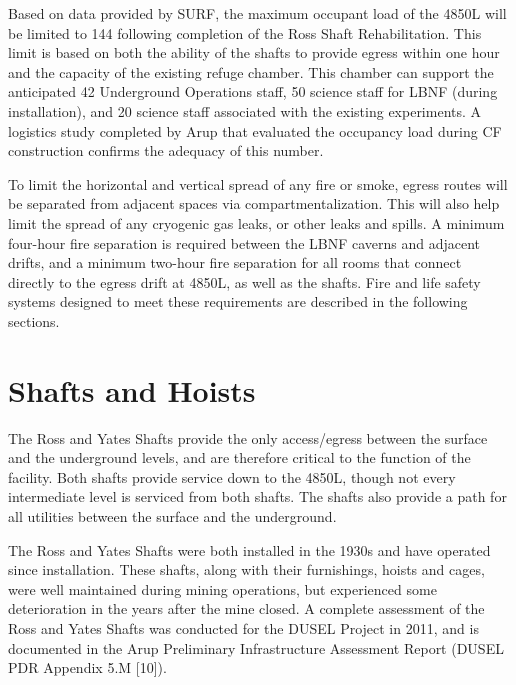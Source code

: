 Based on data provided by SURF, the maximum occupant load of the 4850L will be limited to %
144 following completion of the Ross Shaft Rehabilitation. This limit is based on both the ability of the shafts to provide egress within one hour and the capacity of the existing refuge chamber.  This chamber can support the anticipated 42 Underground Operations staff, 50 science staff for LBNF (during installation), and 20 science staff associated with the existing experiments. A logistics study\cite{lbnf-logistics} completed by Arup that evaluated the occupancy load during CF construction %
confirms the adequacy of this number.

To limit the horizontal and vertical spread of any fire or smoke, egress routes will be separated from adjacent spaces via  compartmentalization. This will also help limit the spread of %
any cryogenic gas leaks, or other leaks and spills. %
A minimum four-hour fire separation is required between the LBNF caverns and adjacent drifts, and a minimum two-hour fire separation for all rooms that connect directly to the egress drift at 4850L, as well as the shafts. %
Fire and life safety systems designed to meet these requirements %
are described in the following sections.


\section{Shafts and Hoists}
\label{sec:fscf-und-shafts}

The Ross and Yates Shafts provide the only access/egress between the surface and the underground levels, and are therefore critical to the function of the facility. Both shafts provide service down to the 4850L, though not every intermediate level is serviced from both shafts. The shafts also provide a path for all utilities between the surface and the underground. 

The Ross and Yates Shafts were both installed in the 1930s and have operated since installation. These shafts, along with their furnishings, hoists and cages, were well maintained during mining operations, but experienced some deterioration in the years after the mine closed. %
A complete assessment of the Ross and Yates Shafts was conducted for the DUSEL Project in 2011, and is documented in the Arup Preliminary Infrastructure Assessment Report (DUSEL PDR Appendix 5.M [10]).



